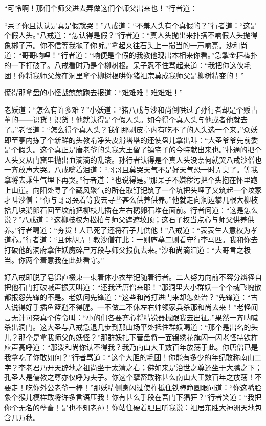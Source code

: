\documentclass[12pt,UTF8]{ctexbook}
\begin{document}
{	“可怜啊！那们个师父进去弄做这们个师父出来也！”行者道：
	
	“呆子你且认认是真是假就哭！”八戒道：“不羞人头有个真假的？”行者道：“这是个假人头。”八戒道：“怎认得是假？”行者道：“真人头抛出来扑搭不响假人头抛得象梆子声。你不信等我抛了你听。”拿起来往石头上一掼当的一声响亮。沙和尚道：“哥哥响哩！”行者道：“响便是个假的我教他现出本相来你看。”急掣金箍棒扑的一下打破了。八戒看时乃是个柳树根。呆子忍不住骂起来道：“我把你这伙毛团！你将我师父藏在洞里拿个柳树根哄你猪祖宗莫成我师父是柳树精变的！”
	
	慌得那拿盘的小怪战兢兢跑去报道：“难难难！难难难！”
	
	老妖道：“怎么有许多难？”小妖道：“猪八戒与沙和尚倒哄过了孙行者却是个贩古董的——识货！识货！他就认得是个假人头。如今得个真人头与他或者他就去了。”老怪道：“怎么得个真人头？我们那剥皮亭内有吃不了的人头选一个来。”众妖即至亭内拣了个新鲜的头教啃净头皮滑塔塔的还使盘儿拿出叫：“大圣爷爷先前委是个假头。这个真正是唐老爷的头我大王留了镇宅子的今特献出来也。”扑通的把个人头又从门窟里抛出血滴滴的乱滚。孙行者认得是个真人头没奈何就哭八戒沙僧也一齐放声大哭。八戒噙着泪道：“哥哥且莫哭天气不是好天气恐一时弄臭了。等我拿将去乘生气埋下再哭。”行者道：“也说得是。”那呆子不嫌秽污把个头抱在怀里跑上山崖。向阳处寻了个藏风聚气的所在取钉钯筑了一个坑把头埋了又筑起一个坟冢才叫沙僧：“你与哥哥哭着等我去寻些甚么供养供养。”他就走向涧边攀几根大柳枝拾几块鹅卵石回至坟前把柳枝儿插在左右鹅卵石堆在面前。行者问道：“这是怎么说？”八戒道：“这柳枝权为松柏与师父遮遮坟顶；这石子权当点心与师父供养供养。”行者喝道：“夯货！人已死了还将石子儿供他！”八戒道：“表表生人意权为孝道心。”行者道：“且休胡弄！教沙僧在此：一则庐墓二则看守行李马匹。我和你去打破他的洞府拿住妖魔碎尸万段与师父报仇去来。”沙和尚滴泪道：“大哥言之极当。你两个着意我在此处看守。”
	
	好八戒即脱了皂锦直裰束一束着体小衣举钯随着行者。二人努力向前不容分辨径自把他石门打破喊声振天叫道：“还我活唐僧来耶！”那洞里大小群妖一个个魂飞魄散都报怨先锋的不是。老妖问先锋道：“这些和尚打进门来却怎处治？”先锋道：“古人说得好手插鱼篮避不得腥。一不做二不休左右帅领家兵杀那和尚去来！”老怪闻言无计可奈真个传令叫：“小的们各要齐心将精锐器械跟我去出征。”果然一齐呐喊杀出洞门。这大圣与八戒急退几步到那山场平处抵住群妖喝道：“那个是出名的头儿？那个是拿我师父的妖怪？”那群妖扎下营盘将一面锦绣花旗闪一闪老怪持铁杵应声高呼道：“那泼和尚你认不得我？我乃南山大王数百年放荡于此。你唐僧已是我拿吃了你敢如何？”行者骂道：“这个大胆的毛团！你能有多少的年纪敢称南山二字？李老君乃开天辟地之祖尚坐于太清之右；佛如来是治世之尊还坐于大鹏之下；孔圣人是儒教之尊亦仅呼为夫子。你这个孽畜敢称甚么南山大王数百年之放荡！不要走！吃你外公老爷一棒！”那妖精侧身闪过使杵抵住铁棒睁圆眼问道：“你这嘴脸象个猴儿模样敢将许多言语压我！你有甚么手段在吾门下猖狂？”行者笑道：“我把你个无名的孽畜！是也不知老孙！你站住硬着胆且听我说：祖居东胜大神洲天地包含几万秋。
	
}
\end{document}
